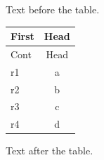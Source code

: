 \documentclass[12pt]{article}
\begin{document}
Text before the table.

\begin{longtable}{lc}
\toprule First & Head\\ \midrule
\endfirsthead
\toprule Cont & Head\\ \midrule
\endhead
\midrule
\endfoot
\bottomrule
\endlastfoot
r1 & a\\
r2 & b\\
r3 & c\\
r4 & d\\
\end{longtable}

Text after the table.
\end{document}
